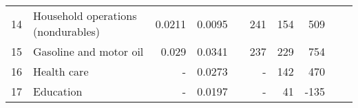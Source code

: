 \documentclass[article,11pt,letterpaper,fleqn]{article}
\theoremstyle{definition}
\numberwithin{equation}{section}
\begin{document}
\begin{table}[h!]
\begin{tabular}{rlrrrrrrrr}
    14    & Household operations (nondurables) & 0.0211 & 0.0095 &       & 241   & 154   & 509   &       &  \\
    15    & Gasoline and motor oil & 0.029 & 0.0341 &       & 237   & 229   & 754   &       &  \\
    16    & Health care & -     & 0.0273 &       & -     & 142   & 470   &       &  \\
    17    & Education & -     & 0.0197 &       & -     & 41    & -135  &       &  \\
    \hline
    \hline
    \end{tabular}%
  \label{tab:est_compare}%
\end{table}%



\end{document}
